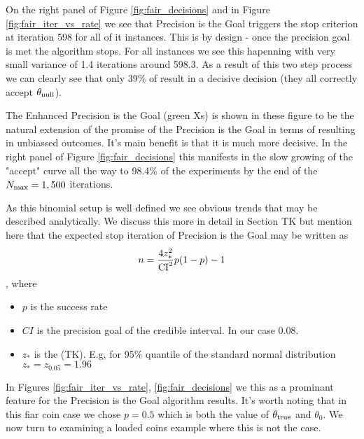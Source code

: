 On the right panel of Figure \ref{fig:fair_decisions} and in Figure \ref{fig:fair_iter_vs_rate}
we see that Precision is the Goal triggers the stop criterion at iteration 598 for all of
it instances. This is by design - once the precision goal is met the algorithm stops.
For all instances we see this hapenning with very small variance of 1.4 iterations around 598.3.
As a result of this two step process we can clearly see that only 39\% of result in a decisive decision
(they all correctly accept $\theta_{\rm null}$). 

The Enhanced Precision is the Goal (green Xs) is shown in these figure to be the natural extension
of the promise of the Precision is the Goal in terms of resulting in unbiassed outcomes. It's main 
benefit is that it is much more decisive. In the right panel of Figure \ref{fig:fair_decisions}
this manifests in the slow growing of the "accept" curve all the way to 98.4\% of the experiments
by the end of the $N_{\rm max}=1,500$ iterations.

As this binomial setup is well defined we see obvious trends
that may be described analytically. We discuss this more in detail
in Section TK but mention here that the expected stop iteration of Precision is the Goal
may be written as $$n = \frac{4 z_{*}^2}{\rm{CI}^2}p(1-p) - 1$$,
where 

\begin{itemize}
  \item $p$ is the success rate
  \item $CI$ is the precision goal of the credible interval. In our case 0.08.
  \item $z_{*}$ is the (TK). E.g, for 95\% quantile of the standard normal distribution $z_{*}=z_{0.05}=1.96$
\end{itemize}

In Figures \ref{fig:fair_iter_vs_rate}, \ref{fig:fair_decisions}
we this as a prominant feature for the Precision is the Goal algorithm results.
It's worth noting that in this fiar coin case we chose $p=0.5$ which is both the value of $\theta_{\rm true}$ and $\theta_0$.
We now turn to examining a loaded coins example where this is not the case.